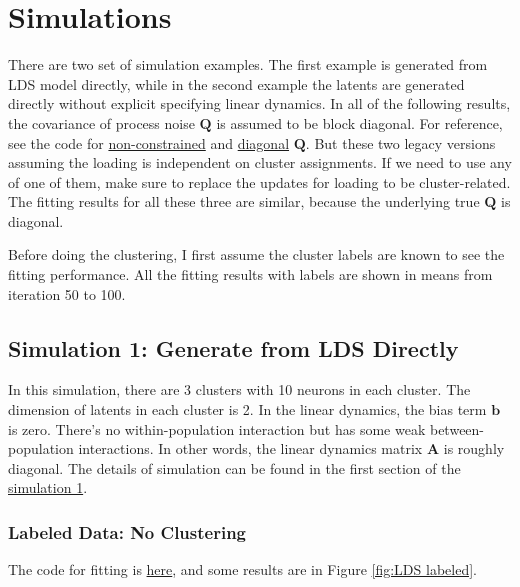 \documentclass[]{article}
\begin{document}
\section{Simulations}
There are two set of simulation examples. The first example is generated from LDS model directly, while in the second example the latents are generated directly without explicit specifying linear dynamics. In all of the following results, the covariance of process noise \(\mathbf{Q}\) is assumed to be block diagonal. For reference, see the code for \href{https://github.com/weigcdsb/state-space-clustering/blob/main/LDS/old_example/sim_LDS_noConstraint.m}{non-constrained} and \href{https://github.com/weigcdsb/state-space-clustering/blob/main/LDS/old_example/sim_LDS_diag.m}{diagonal} \(\mathbf{Q}\). But these two legacy versions assuming the loading is independent on cluster assignments. If we need to use any of one of them, make sure to replace the updates for loading to be cluster-related. The fitting results for all these three are similar, because the underlying true \(\mathbf{Q}\) is diagonal.

Before doing the clustering, I first assume the cluster labels are known to see the fitting performance. All the fitting results with labels are shown in means from iteration 50 to 100.

\subsection{Simulation 1: Generate from LDS Directly}
In this simulation, there are 3 clusters with 10 neurons in each cluster. The dimension of latents in each cluster is 2. In the linear dynamics, the bias term \(\mathbf{b}\) is zero. There's no within-population interaction but has some weak between-population interactions. In other words, the linear dynamics matrix \(\mathbf{A}\) is roughly diagonal. The details of simulation can be found in the first section of the \href{https://github.com/weigcdsb/state-space-clustering/blob/main/LDS/lds_sample.m}{simulation 1}.

\subsubsection{Labeled Data: No Clustering}
The code for fitting is \href{https://github.com/weigcdsb/state-space-clustering/blob/main/LDS/lds_sample.m}{here}, and some results are in Figure \ref{fig:LDS labeled}.
\end{document}
